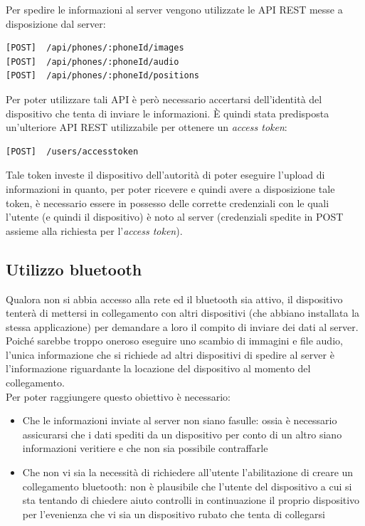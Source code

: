Per spedire le informazioni al server vengono utilizzate le API REST messe a disposizione dal server:
\begin{lstlisting}[caption=API REST utilizzate per spedire dati al server]
[POST]	/api/phones/:phoneId/images
[POST] 	/api/phones/:phoneId/audio
[POST]  /api/phones/:phoneId/positions
\end{lstlisting}
Per poter utilizzare tali API è però necessario accertarsi dell'identità del dispositivo che tenta di inviare le informazioni. \`E quindi stata predisposta un'ulteriore API REST utilizzabile per ottenere un \textit{access token}:
\begin{lstlisting}[caption=API REST utilizzate per identificarsi e ricevere l'access token]
[POST]	/users/accesstoken
\end{lstlisting}
Tale token investe il dispositivo dell'autorità di poter eseguire l'upload di informazioni in quanto, per poter ricevere e quindi avere a disposizione tale token, è necessario essere in possesso delle corrette credenziali con le quali l'utente (e quindi il dispositivo) è noto al server (credenziali spedite in POST assieme alla richiesta per l'\textit{access token}).

\subsection{Utilizzo bluetooth}
Qualora non si abbia accesso alla rete ed il bluetooth sia attivo, il dispositivo tenterà di mettersi in collegamento con altri dispositivi (che abbiano installata la stessa applicazione) per demandare a loro il compito di inviare dei dati al server. Poiché sarebbe troppo oneroso eseguire uno scambio di immagini e file audio, l'unica informazione che si richiede ad altri dispositivi di spedire al server è l'informazione riguardante la locazione del dispositivo al momento del collegamento.\\
Per poter raggiungere questo obiettivo è necessario:
\begin{itemize}
  \item Che le informazioni inviate al server non siano fasulle: ossia è necessario assicurarsi che i dati spediti da un dispositivo per conto di un altro siano informazioni veritiere e che non sia possibile contraffarle
  \item Che non vi sia la necessità di richiedere all'utente l'abilitazione di creare un collegamento bluetooth: non è plausibile che l'utente del dispositivo a cui si sta tentando di chiedere aiuto controlli in continuazione il proprio dispositivo per l'evenienza che vi sia un dispositivo rubato che tenta di collegarsi
\end{itemize}

